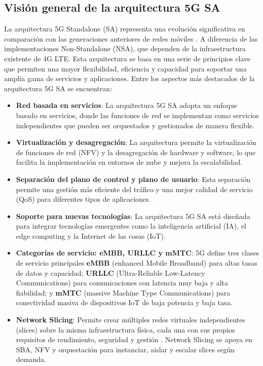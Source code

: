 \subsection{Visión general de la arquitectura 5G SA}
La arquitectura 5G Standalone (SA) representa una evolución significativa en comparación con las generaciones anteriores de redes móviles \cite{3gpp.23.501}. A diferencia de las implementaciones Non-Standalone (NSA), que dependen de la infraestructura existente de 4G LTE. Esta arquitectura se basa en una serie de principios clave que permiten una mayor flexibilidad, eficiencia y capacidad para soportar una amplia gama de servicios y aplicaciones. Entre los aspectos más destacados de la arquitectura 5G SA se encuentran:
\begin{itemize}
    \item \textbf{Red basada en servicios}: La arquitectura 5G SA adopta un enfoque basado en servicios, donde las funciones de red se implementan como servicios independientes que pueden ser orquestados y gestionados de manera flexible.
\item \textbf{Virtualización y desagregación}: La arquitectura permite la virtualización de funciones de red (NFV) y la desagregación de hardware y software, lo que facilita la implementación en entornos de nube y mejora la escalabilidad.
    \item \textbf{Separación del plano de control y plano de usuario}: Esta separación permite una gestión más eficiente del tráfico y una mejor calidad de servicio (QoS) para diferentes tipos de aplicaciones.
    \item \textbf{Soporte para nuevas tecnologías}: La arquitectura 5G SA está diseñada para integrar tecnologías emergentes como la inteligencia artificial (IA), el edge computing y la Internet de las cosas (IoT).
\item \textbf{Categorías de servicio: eMBB, URLLC y mMTC}: 5G define tres clases de servicio principales \textbf{eMBB} (enhanced Mobile Broadband) para altas tasas de datos y capacidad; \textbf{URLLC} (Ultra-Reliable Low-Latency Communications) para comunicaciones con latencia muy baja y alta fiabilidad; y \textbf{mMTC} (massive Machine Type Communications) para conectividad masiva de dispositivos IoT de baja potencia y baja tasa.
\item \textbf{Network Slicing}: Permite crear múltiples redes virtuales independientes (slices) sobre la misma infraestructura física, cada una con sus propios requisitos de rendimiento, seguridad y gestión \cite{zhang20195g}. Network Slicing se apoya en SBA, NFV y orquestación para instanciar, aislar y escalar slices según demanda.
\end{itemize}

